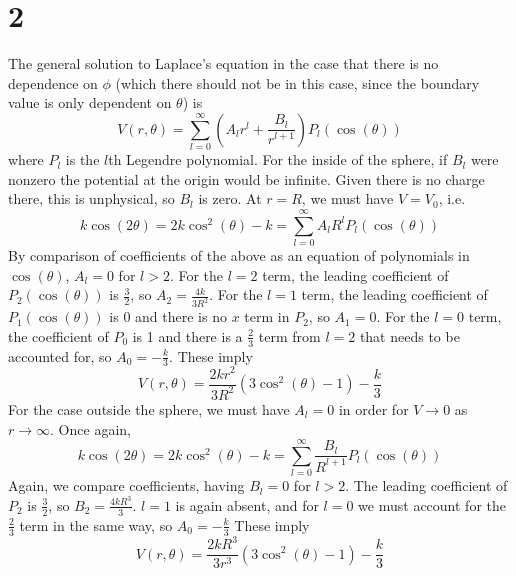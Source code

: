 \documentclass{article}
\begin{document}
\section*{2}
The general solution to Laplace's equation in the case that there is no dependence on $\phi$ (which there should not be in this case, since the boundary value is only dependent on $\theta$) is
\[V(r,\theta)=\sum_{l=0}^\infty\left( A_lr^l+\frac{B_l}{r^{l+1}} \right)P_l(\cos(\theta))\]
where $P_l$ is the $l$th Legendre polynomial. For the inside of the sphere, if $B_l$ were nonzero the potential at the origin would be infinite. Given there is no charge there, this is unphysical, so $B_l$ is zero. At $r=R$, we must have $V=V_0$, i.e.
\[k\cos(2\theta)=2k\cos^2(\theta)-k=\sum_{l=0}^\infty A_lR^lP_l(\cos(\theta))\]
By comparison of coefficients of the above as an equation of polynomials in $\cos(\theta)$, $A_l=0$ for $l >2$. For the $l=2$ term, the leading coefficient of $P_2(\cos(\theta))$ is $\frac{3}{2}$, so $A_2=\frac{4k}{3R^2}$. For the $l=1$ term, the leading coefficient of $P_1(\cos(\theta))$ is 0 and there is no $x$ term in $P_2$, so $A_1=0$. For the $l=0$ term, the coefficient of $P_0$ is 1 and there is a $\frac{2}{3}$ term from $l=2$ that needs to be accounted for, so $A_0=-\frac{k}{3}$. These imply
\[V(r,\theta)=\frac{2kr^2}{3R^2} ({3\cos^2(\theta)-1})-\frac{k}{3}\]
For the case outside the sphere, we must have $A_l=0$ in order for $V\to 0$ as $r\to\infty$. Once again,
\[k\cos(2\theta)=2k\cos^2(\theta)-k=\sum_{l=0}^\infty\frac{B_l}{R^{l+1}}P_l(\cos(\theta))\]
Again, we compare coefficients, having $B_l=0$ for $l>2$. The leading coefficient of $P_2$ is $\frac{3}{2}$, so $B_2=\frac{4kR^3}{3}$. $l=1$ is again absent, and for $l=0$ we must account for the $\frac{2}{3}$ term in the same way, so $A_0=-\frac{k}{3}$ These imply
\[V(r,\theta)=\frac{2kR^3}{3r^3}(3\cos^2(\theta)-1)-\frac{k}{3}\]
\end{document}
